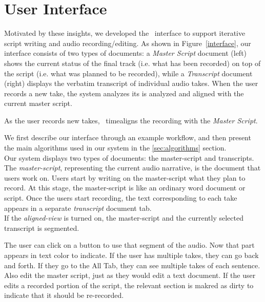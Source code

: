 \section{User Interface}
Motivated by these insights, we developed the \systemname\  interface to support iterative script writing and  audio recording/editing. As shown in Figure~\ref{interface}, our interface
consists of two types of documents: a \textit{Master Script} document (left) shows the current status of the final track (i.e. what has been recorded) on top of the script (i.e. what was planned to be recorded), while a \textit{Transcript} document (right) displays the verbatim transcript of individual audio takes. When the user records a new take, the system analyzes its  is analyzed and aligned with the current master script. 

As the user records new takes, \systemname\ timealigns
the recording with the \textit {Master Script}. 


We first describe our interface through an example workflow, and then present the main algorithms used in our system in the \ref{sec:algorithms} section.\\
 Our system displays two types of documents: the master-script and transcripts. The \textit{master-script}, representing the current audio narrative, is the document that users work on. Users start by writing on the master-script what they plan to
record. At this stage, the master-script is like an ordinary
word document or script. Once the users start recording, the text corresponding to each take appears in a separate \textit{transcript} document tab.\\
If the \textit{aligned-view} is turned on, the master-script and the currently selected transcript is segmented.

The user can click on a button to use that segment of the audio. Now that part appears in text color to indicate. If the user has multiple takes, they can go back and forth. If they go to the All Tab, they can see multiple takes of each sentence.
Also edit the master script, just as they would edit a text document. If the user edits a recorded portion of the script, the relevant section is makred as dirty to indicate that it should be re-recorded.

